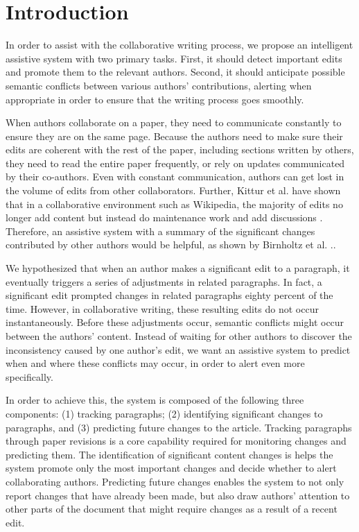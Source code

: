 \section{Introduction}\label{introduction}

In order to assist with the collaborative writing process, we propose an
intelligent assistive system with two primary tasks. First, it should
detect important edits and promote them to the relevant authors. Second,
it should anticipate possible semantic conflicts between various
authors' contributions, alerting when appropriate in order to ensure
that the writing process goes smoothly.

When authors collaborate on a paper, they need to communicate constantly
to ensure they are on the same page. Because the authors need to make
sure their edits are coherent with the rest of the paper, including
sections written by others, they need to read the entire paper
frequently, or rely on updates communicated by their co-authors. Even
with constant communication, authors can get lost in the volume of edits
from other collaborators. Further, Kittur et al. have shown that in a
collaborative environment such as Wikipedia, the majority of edits no
longer add content but instead do maintenance work and add discussions
\cite{kittur2007he}. Therefore, an assistive system with a summary of
the significant changes contributed by other authors would be helpful,
as shown by Birnholtz et al. \cite{birnholtz2012tracking}..

We hypothesized that when an author makes a significant edit to a
paragraph, it eventually triggers a series of adjustments in related
paragraphs. In fact, a significant edit prompted changes in related
paragraphs eighty percent of the time. However, in collaborative
writing, these resulting edits do not occur instantaneously. Before
these adjustments occur, semantic conflicts might occur between the
authors' content. Instead of waiting for other authors to discover the
inconsistency caused by one author's edit, we want an assistive system
to predict when and where these conflicts may occur, in order to alert
even more specifically.

In order to achieve this, the system is composed of the following three
components: (1) tracking paragraphs; (2) identifying significant changes
to paragraphs, and (3) predicting future changes to the article.
Tracking paragraphs through paper revisions is a core capability
required for monitoring changes and predicting them. The identification
of significant content changes is helps the system promote only the most
important changes and decide whether to alert collaborating authors.
Predicting future changes enables the system to not only report changes
that have already been made, but also draw authors' attention to other
parts of the document that might require changes as a result of a recent
edit.

